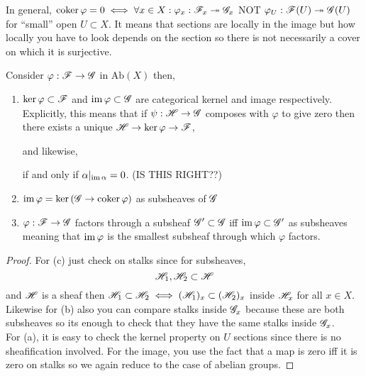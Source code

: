 \documentclass[12pt]{article}
\begin{document}
\begin{rmk}
In general, $\operatorname{\mathrm{coker}}{\varphi} = 0 \iff \forall x \in X : \varphi_x : \mathscr{F}_x \twoheadrightarrow \mathscr{G}_x$ NOT $\varphi_U : \mathscr{F}(U) \twoheadrightarrow \mathscr{G}(U)$ for ``small'' open $U \subset X$. It means that sections are locally in the image but how locally you have to look depends on the section so there is not necessarily a cover on which it is surjective. 
\end{rmk}

\begin{thm}
Consider $\varphi : \mathscr{F} \to \mathscr{G}$ in $\mathrm{Ab}(X)$ then,
\begin{enumerate}
\item $\ker{\varphi} \subset \mathscr{F}$ and $\operatorname{\mathrm{im}}{\varphi} \subset \mathscr{G}$ are categorical kernel and image respectively. Explicitly, this means that if $\psi : \mathscr{H} \to \mathscr{G}$ composes with $\varphi$ to give zero then there exists a unique $\mathscr{H} \to \ker{\varphi} \to \mathscr{F}$,
\begin{center}
\end{center}
and likewise,
\begin{center}
\end{center}
if and only if $\alpha|_{\operatorname{\mathrm{im}}{\alpha}} = 0$. (IS THIS RIGHT??)

\item $\operatorname{\mathrm{im}}{\varphi} = \ker{(\mathscr{G}\to \operatorname{\mathrm{coker}}{\varphi})}$ as subsheaves of $\mathscr{G}$

\item $\varphi : \mathscr{F} \to \mathscr{G}$ factors through a subsheaf $\mathscr{G}' \subset \mathscr{G}$ iff $\operatorname{\mathrm{im}}{\varphi} \subset \mathscr{G}'$ as subsheaves meaning that $\operatorname{\mathrm{im}}{\varphi}$ is the smallest subsheaf through which $\varphi$ factors.
\end{enumerate}
\end{thm}

\begin{proof}
For (c) just check on stalks since for subsheaves,
\[ \mathscr{H}_1, \mathscr{H}_2 \subset \mathscr{H} \]
and $\mathscr{H}$ is a sheaf then $\mathscr{H}_1 \subset \mathscr{H}_2 \iff (\mathscr{H}_1)_x \subset (\mathscr{H}_2)_x$ inside $\mathscr{H}_x$ for all $x \in X$.
\bigskip\\
Likewise for (b) also you can compare stalks inside $\mathscr{G}_x$ because these are both subsheaves so its enough to check that they have the same stalks inside $\mathscr{G}_x$.
\bigskip\\
For (a), it is easy to check the kernel property on $U$ sections since there is no sheafification involved. For the image, you use the fact that a map is zero iff it is zero on stalks so we again reduce to the case of abelian groups.
\end{proof}
\end{document}
